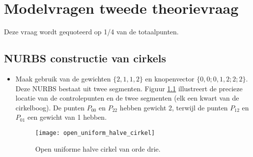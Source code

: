 \chapter{Modelvragen tweede theorievraag}
Deze vraag wordt gequoteerd op 1/4 van de totaalpunten.
\section{NURBS constructie van cirkels }
\begin{enumerate}
	{\begin{itemize} 
		\item Maak gebruik van de gewichten $\{2, 1, 1, 2\}$ en knopenvector $\{0,0;0,1,2;2;2\}$. Deze NURBS bestaat uit twee segmenten. Figuur \ref{fig:open_uniform_halve_cirkel} illustreert de precieze locatie van de controlepunten en de twee segmenten (elk een kwart van de cirkelboog). De punten $P_{00}$ en $P_{22}$ hebben gewicht 2, terwijl de punten $P_{12}$ en $P_{01}$ een gewicht van 1 hebben.
		\begin{figure}[ht]
			\centering
			\texttt{[image: open\_uniform\_halve\_cirkel]}
			\caption{Open uniforme halve cirkel van orde drie.}
			\label{fig:open_uniform_halve_cirkel} 
		\end{figure}
		\end{itemize}
	}


\end{enumerate}
